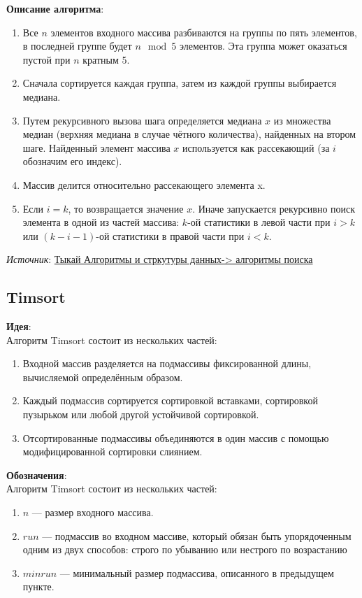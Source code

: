 \noindent\textbf{Описание алгоритма}:
\begin{enumerate}
    \item Все $n$ элементов входного массива разбиваются на группы по пять элементов, в последней группе будет $n \mod 5$ элементов. Эта группа может оказаться пустой при $n$ кратным 5.
    \item Сначала сортируется каждая группа, затем из каждой группы выбирается медиана.
	\item Путем рекурсивного вызова шага определяется медиана $x$ из множества медиан (верхняя медиана в случае чётного количества), найденных на втором шаге. Найденный элемент массива $x$ используется как рассекающий (за $i$ обозначим его индекс).
	\item Массив делится относительно рассекающего элемента x.
	\item Если $i = k$, то возвращается значение $x$. Иначе запускается рекурсивно поиск элемента в одной из частей массива: $k$-ой статистики в левой части при $i > k$ или $(k - i - 1)$-ой статистики в правой части при $i < k$.
\end{enumerate}

\noindent\textit{Источник}: \href{http://neerc.ifmo.ru/wiki}{Тыкай Алгоритмы и стркутуры данных-> алгоритмы поиска}

\subsection{Timsort}
\noindent\textbf{Идея}:\\
Алгоритм Timsort состоит из нескольких частей: 
\begin{enumerate}
    \item Входной массив разделяется на подмассивы фиксированной длины, вычисляемой определённым образом.
    \item  Каждый подмассив сортируется сортировкой вставками, сортировкой пузырьком или любой другой устойчивой сортировкой.
    \item  Отсортированные подмассивы объединяются в один массив с помощью модифицированной сортировки слиянием.
\end{enumerate}


\noindent\textbf{Обозначения}:\\
Алгоритм Timsort состоит из нескольких частей: 
\begin{enumerate}
    \item $n$ — размер входного массива.
    \item $run$ — подмассив во входном массиве, который обязан быть упорядоченным одним из двух способов: строго по убыванию или нестрого по возрастанию
    \item $minrun$ — минимальный размер подмассива, описанного в предыдущем пункте.
\end{enumerate}


